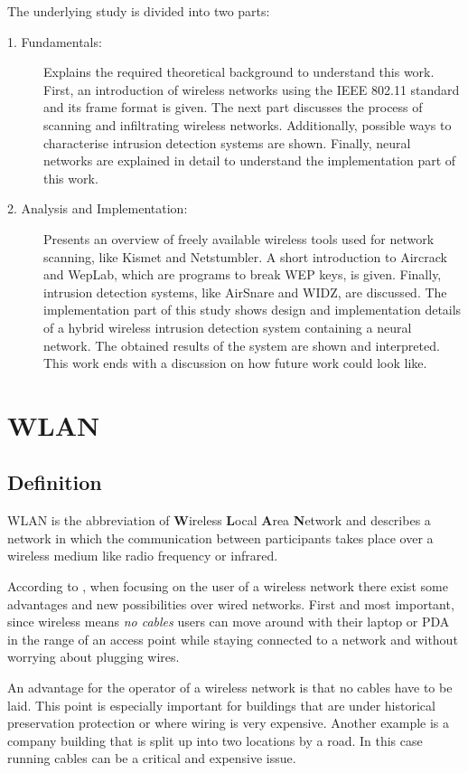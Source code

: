 The underlying study is divided into two parts:

\begin{description}
    \item[1. Fundamentals:] Explains the required theoretical background to understand this work. First, an introduction of wireless networks using the \ac{IEEE} 802.11 standard and its frame format is given. The next part discusses the process of scanning and infiltrating wireless networks. Additionally, possible ways to characterise intrusion detection systems are shown. Finally, neural networks are explained in detail to understand the implementation part of this work.
	\item[2. Analysis and Implementation:] Presents an overview of freely available wireless tools used for network scanning, like Kismet and Netstumbler. A short introduction to Aircrack and WepLab, which are programs to break WEP keys, is given. Finally, intrusion detection systems, like AirSnare and WIDZ, are discussed. The implementation part of this study shows design and implementation details of a hybrid wireless intrusion detection system containing a neural network. The obtained results of the system are shown and interpreted. This work ends with a discussion on how future work could look like.
\end{description}

\chapter{\ac{WLAN}}

\section{Definition}

WLAN is the abbreviation of {\bf W}ireless {\bf L}ocal {\bf A}rea {\bf N}etwork and describes a network in which the communication between participants takes place over a wireless medium like radio frequency or infrared.

According to \cite[p.1-3]{80211wireless}, when focusing on the user of a wireless network there exist some advantages and new possibilities over wired networks. First and most important, since wireless means {\em no cables} users can move around with their laptop or \ac{PDA} in the range of an access point while staying connected to a network and without worrying about plugging wires.

An advantage for the operator of a wireless network is that no cables have to be laid. This point is especially important for buildings that are under historical preservation protection or where wiring is very expensive. Another example is a company building that is split up into two locations by a road. In this case running cables can be a critical and expensive issue.

